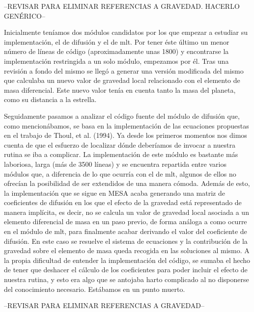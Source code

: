 --REVISAR PARA ELIMINAR REFERENCIAS A GRAVEDAD. HACERLO GENÉRICO--

Inicialmente teníamos dos módulos candidatos por los que empezar a estudiar su implementación, el de difusión y el de mlt. Por tener éste último un menor número de líneas de código (aproximadamente unas 1800) y encontrarse la implementación restringida a un solo módulo, empezamos por él. Tras una revisión a fondo del mismo se llegó a generar una versión modificada del mismo que calculaba un nuevo valor de gravedad local relacionado con el elemento de masa diferencial. Este nuevo valor tenía en cuenta tanto la masa del planeta, como su distancia a la estrella.\par

Seguidamente pasamos a analizar el código fuente del módulo de difusión que, como mencionábamos, se basa en la implementación de las ecuaciones propuestas en el trabajo de Thoul, et al. (1994). Ya desde los primeros momentos nos dimos cuenta de que el esfuerzo de localizar dónde deberíamos de invocar a nuestra rutina se iba a complicar. La implementación de este módulo es bastante más laboriosa, larga (más de 3500 líneas) y se encuentra repartida entre varios módulos que, a diferencia de lo que ocurría con el de mlt, algunos de ellos no ofrecían la posibilidad de ser extendidos de una manera cómoda. Además de esto, la implementación que se sigue en MESA acaba generando una matriz de coeficientes de difusión en los que el efecto de la gravedad está representado de manera implícita, es decir, no se calcula un valor de gravedad local asociada a un elemento diferencial de masa en un paso previo, de forma análoga a como ocurre en el módulo de mlt, para finalmente acabar derivando el valor del coeficiente de difusión. En este caso se resuelve el sistema de ecuaciones y la contribución de la gravedad sobre el elemento de masa queda recogida en las soluciones al mismo. A la propia dificultad de entender la implementación del código, se sumaba el hecho de tener que deshacer el cálculo de los coeficientes para poder incluir el efecto de nuestra rutina, y esto era algo que se antojaba harto complicado al no disponerse del conocimiento necesario. Estábamos en un punto muerto.

--REVISAR PARA ELIMINAR REFERENCIAS A GRAVEDAD--

